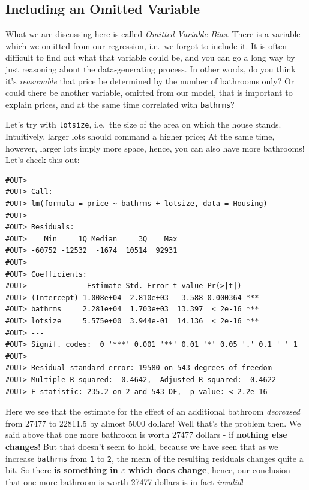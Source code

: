 \documentclass[]{book}
\begin{document}
\hypertarget{including-an-omitted-variable}{%
\subsection{Including an Omitted Variable}\label{including-an-omitted-variable}}

What we are discussing here is called \emph{Omitted Variable Bias}. There is a variable which we omitted from our regression, i.e.~we forgot to include it. It is often difficult to find out what that variable could be, and you can go a long way by just reasoning about the data-generating process. In other words, do you think it's \emph{reasonable} that price be determined by the number of bathrooms only? Or could there be another variable, omitted from our model, that is important to explain prices, and at the same time correlated with \texttt{bathrms}?

Let's try with \texttt{lotsize}, i.e.~the size of the area on which the house stands. Intuitively, larger lots should command a higher price; At the same time, however, larger lots imply more space, hence, you can also have more bathrooms! Let's check this out:

\begin{verbatim}
#OUT> 
#OUT> Call:
#OUT> lm(formula = price ~ bathrms + lotsize, data = Housing)
#OUT> 
#OUT> Residuals:
#OUT>    Min     1Q Median     3Q    Max 
#OUT> -60752 -12532  -1674  10514  92931 
#OUT> 
#OUT> Coefficients:
#OUT>              Estimate Std. Error t value Pr(>|t|)    
#OUT> (Intercept) 1.008e+04  2.810e+03   3.588 0.000364 ***
#OUT> bathrms     2.281e+04  1.703e+03  13.397  < 2e-16 ***
#OUT> lotsize     5.575e+00  3.944e-01  14.136  < 2e-16 ***
#OUT> ---
#OUT> Signif. codes:  0 '***' 0.001 '**' 0.01 '*' 0.05 '.' 0.1 ' ' 1
#OUT> 
#OUT> Residual standard error: 19580 on 543 degrees of freedom
#OUT> Multiple R-squared:  0.4642,	Adjusted R-squared:  0.4622 
#OUT> F-statistic: 235.2 on 2 and 543 DF,  p-value: < 2.2e-16
\end{verbatim}

Here we see that the estimate for the effect of an additional bathroom \emph{decreased} from 27477 to 22811.5 by almost 5000 dollars! Well that's the problem then. We said above that one more bathroom is worth 27477 dollars - if \textbf{nothing else changes}! But that doesn't seem to hold, because we have seen that as we increase \texttt{bathrms} from \texttt{1} to \texttt{2}, the mean of the resulting residuals changes quite a bit. So there \textbf{is something in \(\varepsilon\) which does change}, hence, our conclusion that one more bathroom is worth 27477 dollars is in fact \emph{invalid}!
\end{document}
